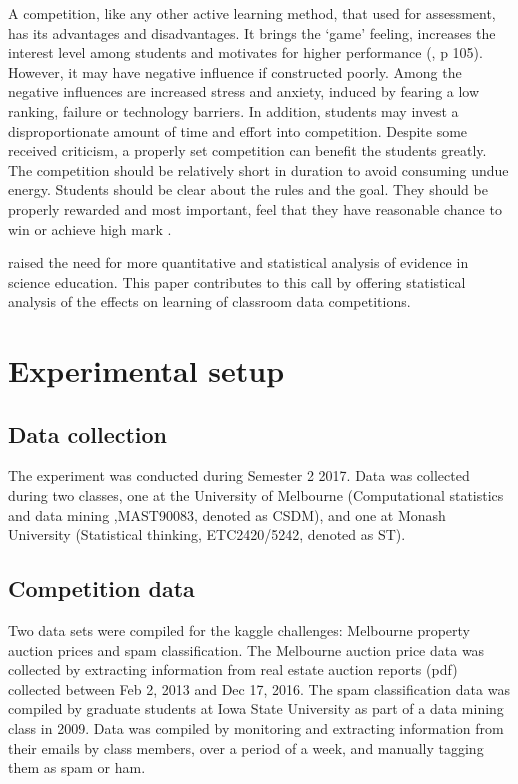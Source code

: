 \documentclass[12pt]{article}
\begin{document}
A competition, like any other active learning method, that used for
assessment, has its advantages and disadvantages. It brings the `game'
feeling, increases the interest level among students and motivates for
higher performance (\citet{Shindler09}, p 105). However, it may have
negative influence if constructed poorly. Among the negative influences
are increased stress and anxiety, induced by fearing a low ranking,
failure or technology barriers. In addition, students may invest a
disproportionate amount of time and effort into competition. Despite
some received criticism, a properly set competition can benefit the
students greatly. The competition should be relatively short in duration
to avoid consuming undue energy. Students should be clear about the
rules and the goal. They should be properly rewarded and most important,
feel that they have reasonable chance to win or achieve high mark
\citep{Shindler09}.

\citet{Shelley08} raised the need for more quantitative and statistical
analysis of evidence in science education. This paper contributes to
this call by offering statistical analysis of the effects on learning of
classroom data competitions.

\section{Experimental setup}\label{experimental-setup}

\subsection{Data collection}\label{data-collection}

The experiment was conducted during Semester 2 2017. Data was collected
during two classes, one at the University of Melbourne (Computational
statistics and data mining ,MAST90083, denoted as CSDM), and one at
Monash University (Statistical thinking, ETC2420/5242, denoted as ST).

\subsection{Competition data}\label{competition-data}

Two data sets were compiled for the kaggle challenges: Melbourne
property auction prices and spam classification. The Melbourne auction
price data was collected by extracting information from real estate
auction reports (pdf) collected between Feb 2, 2013 and Dec 17, 2016.
The spam classification data was compiled by graduate students at Iowa
State University as part of a data mining class in 2009. Data was
compiled by monitoring and extracting information from their emails by
class members, over a period of a week, and manually tagging them as
spam or ham.
\end{document}
